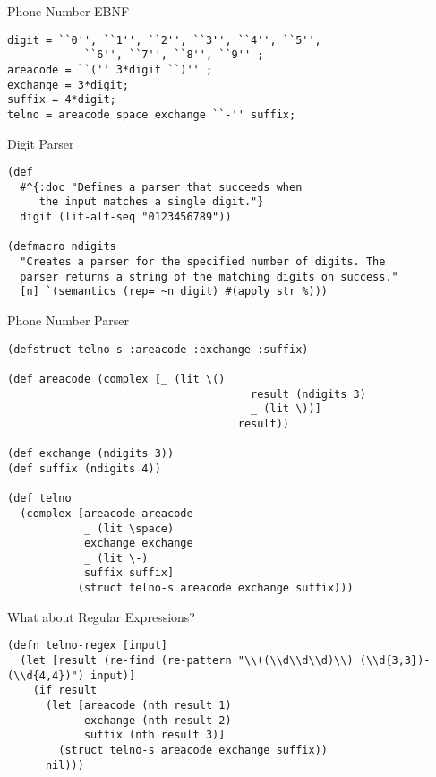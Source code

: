 \documentclass[presentation]{beamer}
\begin{document}
%
%
\begin{frame}[fragile]{Phone Number \ac{EBNF}}
\begin{verbatim}
digit = ``0'', ``1'', ``2'', ``3'', ``4'', ``5'',
            ``6'', ``7'', ``8'', ``9'' ;
areacode = ``('' 3*digit ``)'' ;
exchange = 3*digit;
suffix = 4*digit;
telno = areacode space exchange ``-'' suffix;
\end{verbatim}
\end{frame}

\begin{frame}[fragile]{Digit Parser}
\begin{verbatim}
(def
  #^{:doc "Defines a parser that succeeds when
     the input matches a single digit."}
  digit (lit-alt-seq "0123456789"))

(defmacro ndigits
  "Creates a parser for the specified number of digits. The
  parser returns a string of the matching digits on success."
  [n] `(semantics (rep= ~n digit) #(apply str %)))
\end{verbatim}
\end{frame}

\begin{frame}[fragile]{Phone Number Parser}
\begin{verbatim}
(defstruct telno-s :areacode :exchange :suffix)

(def areacode (complex [_ (lit \()
                                      result (ndigits 3)
                                      _ (lit \))]
                                    result))

(def exchange (ndigits 3))
(def suffix (ndigits 4))

(def telno
  (complex [areacode areacode
            _ (lit \space)
            exchange exchange
            _ (lit \-)
            suffix suffix]
           (struct telno-s areacode exchange suffix)))
\end{verbatim}
\end{frame}

\begin{frame}[fragile]{What about Regular Expressions?}

\begin{verbatim}
(defn telno-regex [input]
  (let [result (re-find (re-pattern "\\((\\d\\d\\d)\\) (\\d{3,3})-(\\d{4,4})") input)]
    (if result
      (let [areacode (nth result 1)
            exchange (nth result 2)
            suffix (nth result 3)]
        (struct telno-s areacode exchange suffix))
      nil)))
\end{verbatim}
\end{frame}
\end{document}

